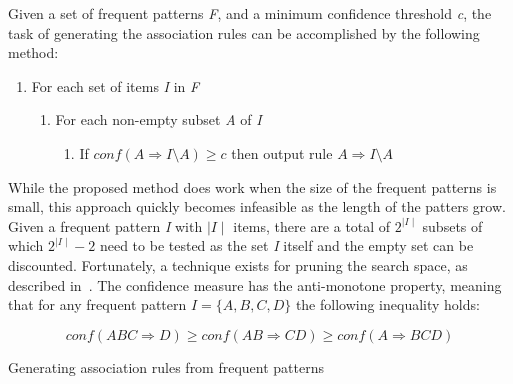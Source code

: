 Given a set of frequent patterns \textit{F}, and a minimum confidence threshold \textit{c}, the task of generating the association rules can be accomplished by the following method: 

\begin{enumerate}
	\item For each set of items \textit{I} in \textit{F}
	\begin{enumerate}
		\item For each non-empty subset \textit{A} of \textit{I}
		\begin{enumerate}
			\item If $conf(A \Rightarrow I \setminus A ) \geq \textit{c}$ then output rule $A \Rightarrow I \setminus A$
		\end{enumerate}
	\end{enumerate}
\end{enumerate}      

While the proposed method does work when the size of the frequent patterns is small, this approach quickly becomes infeasible as the length of the patters grow. Given a frequent pattern \textit{I} with $\mid\textit{I}\mid$ items, there are a total of $2^{\mid\textit{I}\mid}$ subsets of which $2^{\mid\textit{I}\mid} - 2$ need to be tested as the set \textit{I} itself and the empty set can be discounted. Fortunately, a technique exists for pruning the search space, as described in~\cite{Agrawal:1994:FAM:645920.672836}. The confidence measure has the anti-monotone property, meaning that for any frequent pattern $I = \{A, B, C, D\}$ the following inequality holds:

\[ conf(ABC \Rightarrow D) \geq conf(AB \Rightarrow CD) \geq conf(A \Rightarrow BCD) \] 

\begin{algorithm}[!htbp]
\SetAlgoLined\DontPrintSemicolon
	\caption{Generating association rules from frequent patterns}
	\label{Algorithm:generate-association-rules}
\end{algorithm}

